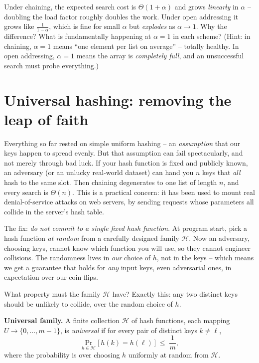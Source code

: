 \begin{walkbox}
Under chaining, the expected search cost is $\Theta(1+\alpha)$ and grows \emph{linearly} in $\alpha$ -- doubling the load factor roughly doubles the work. Under open addressing it grows like $\frac{1}{1-\alpha}$, which is fine for small $\alpha$ but \emph{explodes} as $\alpha \to 1$. Why the difference? What is fundamentally happening at $\alpha = 1$ in each scheme? (Hint: in chaining, $\alpha = 1$ means ``one element per list on average'' -- totally healthy. In open addressing, $\alpha = 1$ means the array is \emph{completely full}, and an unsuccessful search must probe everything.)
\end{walkbox}

\section{Universal hashing: removing the leap of faith}

Everything so far rested on simple uniform hashing -- an \emph{assumption} that our keys happen to spread evenly. But that assumption can fail spectacularly, and not merely through bad luck. If your hash function is fixed and publicly known, an adversary (or an unlucky real-world dataset) can hand you $n$ keys that \emph{all} hash to the same slot. Then chaining degenerates to one list of length $n$, and every search is $\Theta(n)$. This is a practical concern: it has been used to mount real denial-of-service attacks on web servers, by sending requests whose parameters all collide in the server's hash table.

\begin{intuitionbox}
The fix: \emph{do not commit to a single fixed hash function}. At program start, pick a hash function \emph{at random} from a carefully designed family $\mathcal{H}$. Now an adversary, choosing keys, cannot know which function you will use, so they cannot engineer collisions. The randomness lives in \emph{our} choice of $h$, not in the keys -- which means we get a guarantee that holds for \emph{any} input keys, even adversarial ones, in expectation over our coin flips.
\end{intuitionbox}

What property must the family $\mathcal{H}$ have? Exactly this: any two distinct keys should be unlikely to collide, over the random choice of $h$.

\begin{formalbox}
\textbf{Universal family.} A finite collection $\mathcal{H}$ of hash functions, each mapping $U \to \{0,\dots,m-1\}$, is \emph{universal} if for every pair of distinct keys $k \neq \ell$,
\[
  \Pr_{h \in \mathcal{H}}\big[\, h(k) = h(\ell) \,\big] \;\le\; \frac{1}{m},
\]
where the probability is over choosing $h$ uniformly at random from $\mathcal{H}$.
\end{formalbox}

